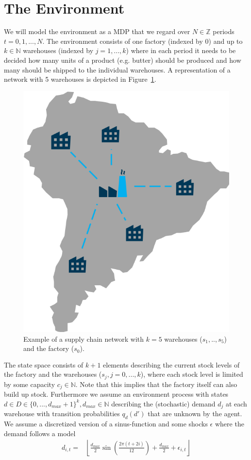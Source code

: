 \documentclass[journal, a4paper]{IEEEtran}
\theoremstyle{plain}
\theoremstyle{definition}
\begin{document}
\section{The Environment}
\label{sec:env}
We will model the environment as a MDP that we regard over $N \in \mathbb{Z}$ periods $t = 0, 1, ..., N$. The environment consists of one factory (indexed by $0$) and up to $k \in \mathbb{N}$ warehouses (indexed by $j=1,...,k$) where in each period it needs to be decided how many units of a product (e.g. butter) should be produced and how many should be shipped to the individual warehouses. A representation of a network with 5 warehouses is depicted in Figure~\ref{model_example}. 
\begin{figure}[h]
	\centering
	\includegraphics[width=0.4\columnwidth]{model.png}
	\caption{\label{model_example}Example of a supply chain network with $k=5$ warehouses ($s_1, .., s_5$) and the factory ($s_0$).}
\end{figure}
The state space consists of $k+1$ elements describing the current stock levels of the factory and the warehouses ($s_j, j=0,...,k$), where each stock level is limited by some capacity $c_j \in \mathbb{N}$. Note that this implies that the factory itself can also build up stock. Furthermore we assume an environment process with states $d \in D \in \{0,..., d_{max}+1\}^k, d_{max} \in \mathbb{N}$ describing the (stochastic) demand $d_j$ at each warehouse with transition probabilities $q_d(d')$ that are unknown by the agent. We assume a discretized version of a sinus-function and some shocks $\epsilon$ where the demand follows a model 
\begin{equation}
	\begin{split}
		d_{i,t} = &\left\lfloor \frac{d_{max}}{2} \sin\left( \frac{2 \pi (t + 2i) }{12}\right) + \frac{d_{max}}{2} + \epsilon_{i,t} \right\rfloor
	\end{split}
\end{equation}
\end{document}

